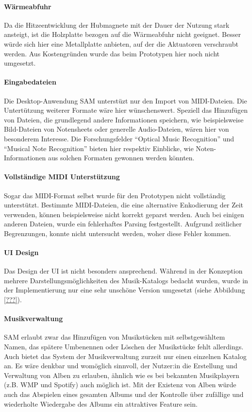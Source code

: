 \paragraph{Wärmeabfuhr}
Da die Hitzeentwicklung der Hubmagnete mit der Dauer der Nutzung stark ansteigt, ist die Holzplatte bezogen auf die Wärmeabfuhr nicht geeignet.
Besser würde sich hier eine Metallplatte anbieten, auf der die Aktuatoren verschraubt werden.
Aus Kostengründen wurde das beim Prototypen hier noch nicht umgesetzt.

\paragraph{Eingabedateien}
Die Desktop-Anwendung \ac{SAM} unterstüzt nur den Import von \ac{MIDI}-Dateien.
Die Untertützung weiterer Formate wäre hier wünschenswert.
Speziell das Hinzufügen von Dateien, die grundlegend andere Informationen speichern, wie beispielsweise Bild-Dateien von Notensheets oder generelle Audio-Dateien, wären hier von besonderem Interesse.
Die Forschungsfelder \enquote{Optical Music Recognition} und \enquote{Musical Note Recognition} bieten hier respektiv Einblicke, wie Noten-Informationen aus solchen Formaten gewonnen werden könnten.

\paragraph{Vollständige \ac{MIDI} Unterstützung}
Sogar das \ac{MIDI}-Format selbst wurde für den Prototypen nicht vollständig unterstützt.
Bestimmte \ac{MIDI}-Dateien, die eine alternative Enkodierung der Zeit verwenden, können beispielsweise nicht korrekt geparst werden.
Auch bei einigen anderen Dateien, wurde ein fehlerhaftes Parsing festgestellt.
Aufgrund zeitlicher Begrenzungen, konnte nicht untersucht werden, woher diese Fehler kommen.

\paragraph{\ac{UI} Design}
Das Design der \ac{UI} ist nicht besonders ansprechend.
Während in der Konzeption mehrere Darstellungsmöglichkeiten des Musik-Katalogs bedacht wurden, wurde in der Implementierung nur eine sehr unschöne Version umgesetzt (siehe Abbildung \ref{???}). %

\paragraph{Musikverwaltung}
\ac{SAM} erlaubt zwar das Hinzufügen von Musikstücken mit selbstgewähltem Namen, das spätere Umbenennen oder Löschen der Musikstücke fehlt allerdings.
Auch bietet das System der Musikverwaltung zurzeit nur einen einzelnen Katalog an.
Es wäre denkbar und womöglich sinnvoll, der Nutzer:in die Erstellung und Verwaltung von Alben zu erlauben, ähnlich wie es bei bekannten Musikplayern (z.B. \ac{WMP} und Spotify) auch möglich ist.
Mit der Existenz von Alben würde auch das Abspielen eines gesamten Albums und der Kontrolle über zufällige und wiederholte Wiedergabe des Albums ein attraktives Feature sein.


